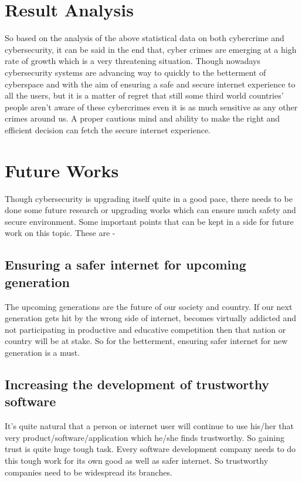 \documentclass[conference,double column]{IEEEtran}
\begin{document}
	\section{Result Analysis}
	So based on the analysis of the above statistical data on both cybercrime and cybersecurity, it can be said in the end that, cyber crimes are emerging at a high rate of growth which is a very threatening situation. Though nowadays cybersecurity systems are advancing way to quickly to the betterment of cyberspace and with the aim of ensuring a safe and secure internet experience to all the users, but it is a matter of regret that still some third world countries' people aren't aware of these cybercrimes even it is as much sensitive as any other crimes around us. A proper cautious mind and ability to make the right and efficient decision can fetch the secure internet experience.
	
	
	\section{Future Works} 
	Though cybersecurity is upgrading itself quite in a good pace, there needs to be done some future research or upgrading works which can ensure much safety and secure environment. Some important points that can be kept in a side for future work on this topic. These are -
	
	
	\subsection{Ensuring a safer internet for upcoming generation}
	The upcoming generations are the future of our society and country. If our next generation gets hit by the wrong side of internet, becomes virtually addicted and not participating in productive and educative competition then that nation or country will be at stake. So for the betterment, ensuring safer internet for new generation is a must.
	
	\subsection{Increasing the development of trustworthy software}
	It's quite natural that a person or internet user will continue to use his/her that very product/software/application which he/she finds trustworthy. So gaining trust is quite huge tough task. Every software development company needs to do this tough work for its own good as well as safer internet. So trustworthy companies need to be widespread its branches.
	
\end{document}
